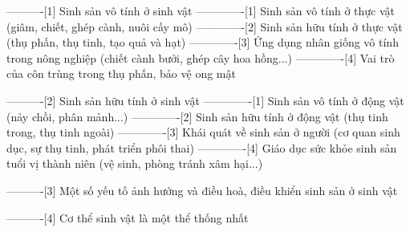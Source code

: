 ----------[1] Sinh sản vô tính ở sinh vật
-------------[1] Sinh sản vô tính ở thực vật (giâm, chiết, ghép cành, nuôi cấy mô)
-------------[2] Sinh sản hữu tính ở thực vật (thụ phấn, thụ tinh, tạo quả và hạt)
-------------[3] Ứng dụng nhân giống vô tính trong nông nghiệp (chiết cành bưởi, ghép cây hoa hồng...)
-------------[4] Vai trò của côn trùng trong thụ phấn, bảo vệ ong mật

----------[2] Sinh sản hữu tính ở sinh vật
-------------[1] Sinh sản vô tính ở động vật (nảy chồi, phân mảnh...)
-------------[2] Sinh sản hữu tính ở động vật (thụ tinh trong, thụ tinh ngoài)
-------------[3] Khái quát về sinh sản ở người (cơ quan sinh dục, sự thụ tinh, phát triển phôi thai)
-------------[4] Giáo dục sức khỏe sinh sản tuổi vị thành niên (vệ sinh, phòng tránh xâm hại...)

----------[3] Một số yếu tố ảnh hưởng và điều hoà, điều khiển sinh sản ở sinh vật

----------[4] Cơ thể sinh vật là một thể thống nhất
